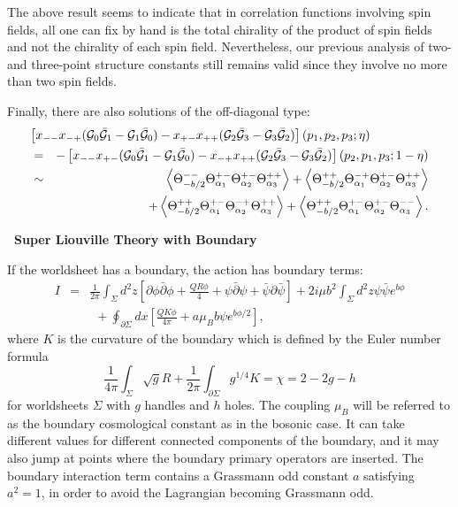 \documentclass[a4paper,12pt]{article}
\def\section#1{
    \addtocounter{section}{1}\setcounter{subsection}{0}\setcounter{equation}{0}
    \vskip8mm\begin{center}{\bf\thesection~#1}\end{center}}
\newcommand{\vev}[1]{\left<{#1}\right>}
\newcommand{\tfrac}[2]{{\textstyle\frac{#1}{#2}}}
\newcommand{\cG}{{\cal G}}
\begin{document}
   The above result seems to indicate that in correlation functions
 involving spin fields, all one can fix by hand is the total chirality
 of the product of spin fields and not the chirality of each spin field.
 Nevertheless, our previous analysis of two- and three-point
 structure constants still remains valid since they involve
 no more than two spin fields.

   Finally, there are also solutions of the off-diagonal type:
\begin{eqnarray}
\lefteqn{
 \left[
  x_{--}x_{-+}(\cG_0\bar{\cG}_1-\cG_1\bar{\cG}_0)
 -x_{+-}x_{++}(\cG_2\bar{\cG}_3-\cG_3\bar{\cG}_2)\right](p_1,p_2,p_3;\eta)
}\nonumber \\
 &=&
 -\left[
  x_{--}x_{+-}(\cG_0\bar{\cG}_1-\cG_1\bar{\cG}_0)
 -x_{-+}x_{++}(\cG_2\bar{\cG}_3-\cG_3\bar{\cG}_2)\right](p_2,p_1,p_3;1-\eta)
 \nonumber \\  &\sim&
    \vev{\Theta_{-b/2}^{--}
         \Theta_{\alpha_1}^{+-}
         \Theta_{\alpha_2}^{+-}
         \Theta_{\alpha_3}^{++}}
   +\vev{\Theta_{-b/2}^{++}
         \Theta_{\alpha_1}^{-+}
         \Theta_{\alpha_2}^{+-}
         \Theta_{\alpha_3}^{++}}
 \nonumber \\ && \hskip-4mm
   +\vev{\Theta_{-b/2}^{++}
         \Theta_{\alpha_1}^{+-}
         \Theta_{\alpha_2}^{-+}
         \Theta_{\alpha_3}^{++}}
   +\vev{\Theta_{-b/2}^{++}
         \Theta_{\alpha_1}^{+-}
         \Theta_{\alpha_2}^{+-}
         \Theta_{\alpha_3}^{--}}.
\end{eqnarray}


\section{Super Liouville Theory with Boundary}%
   If the worldsheet has a boundary, the action has boundary terms:
\begin{eqnarray}
  I&=&\frac{1}{2\pi}\int_\Sigma d^2z\left[
       \partial\phi\bar{\partial}\phi +\tfrac{QR\phi}{4}
      +\psi\bar{\partial}\psi+\bar{\psi}\partial\bar{\psi}
      \right]
      +2i\mu b^2\int_\Sigma d^2z \psi\bar{\psi}e^{b\phi}
  \nonumber \\ && ~~
   + \oint_{\partial\Sigma}dx\left[
       \tfrac{QK\phi}{4\pi}+a\mu_B b\psi e^{b\phi/2}
     \right],
\end{eqnarray}
 where $K$ is the curvature of the boundary
 which is defined by the Euler number formula
\begin{equation}
  \frac{1}{4\pi}\int_{\Sigma}\sqrt{g}R
 +\frac{1}{2\pi}\int_{\partial\Sigma}g^{1/4}K
 =\chi=2-2g-h
\end{equation}
 for worldsheets $\Sigma$ with $g$ handles and $h$ holes.
 The coupling $\mu_B$ will be referred to as the boundary cosmological
 constant as in the bosonic case.
 It can take different values for different connected components
 of the boundary, and it may also jump at points where
 the boundary primary operators are inserted.
 The boundary interaction term contains a Grassmann odd constant
 $a$ satisfying $a^2=1$, in order to avoid the Lagrangian becoming
 Grassmann odd\cite{GZ,N,ARS}.
\end{document}
